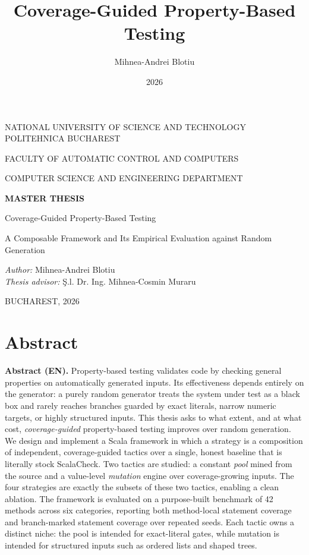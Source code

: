 \documentclass[11pt,a4paper]{report}
\title{Coverage-Guided Property-Based Testing}
\author{Mihnea-Andrei Blotiu}
\date{2026}
\begin{document}
\begin{titlepage}
\centering
{\large NATIONAL UNIVERSITY OF SCIENCE AND TECHNOLOGY POLITEHNICA BUCHAREST\par}
{\large FACULTY OF AUTOMATIC CONTROL AND COMPUTERS\par}
{\large COMPUTER SCIENCE AND ENGINEERING DEPARTMENT\par}
\vfill
{\Huge\bfseries MASTER THESIS\par}
\vspace{1.5cm}
{\LARGE Coverage-Guided Property-Based Testing\par}
{\large A Composable Framework and Its Empirical Evaluation against Random Generation\par}
\vfill
\begin{flushright}
\textit{Author:} \quad Mihnea-Andrei Blotiu\\[0.4cm]
\textit{Thesis advisor:} \quad \c{S}.l. Dr. Ing. Mihnea-Cosmin Muraru
\end{flushright}
\vfill
{\large BUCHAREST, 2026\par}
\end{titlepage}

\chapter*{Abstract}

\noindent\textbf{Abstract (EN).}
Property-based testing validates code by checking general properties on automatically generated
inputs. Its effectiveness depends entirely on the generator: a purely random generator treats the
system under test as a black box and rarely reaches branches guarded by exact literals, narrow
numeric targets, or highly structured inputs. This thesis asks to what extent, and at what cost,
\emph{coverage-guided} property-based testing improves over random generation. We design and implement a
Scala framework in which a strategy is a composition of independent, coverage-guided tactics over a
single, honest baseline that is literally stock ScalaCheck. Two tactics are studied: a constant
\emph{pool} mined from the source and a value-level \emph{mutation} engine over coverage-growing inputs.
The four strategies are exactly the subsets of these two tactics, enabling a clean ablation. The framework
is evaluated on a purpose-built benchmark of 42 methods across six categories, reporting both
method-local statement coverage and branch-marked statement coverage over repeated seeds. Each tactic owns a
distinct niche: the pool is intended for exact-literal gates, while mutation is intended for structured
inputs such as ordered lists and shaped trees.
\end{document}
